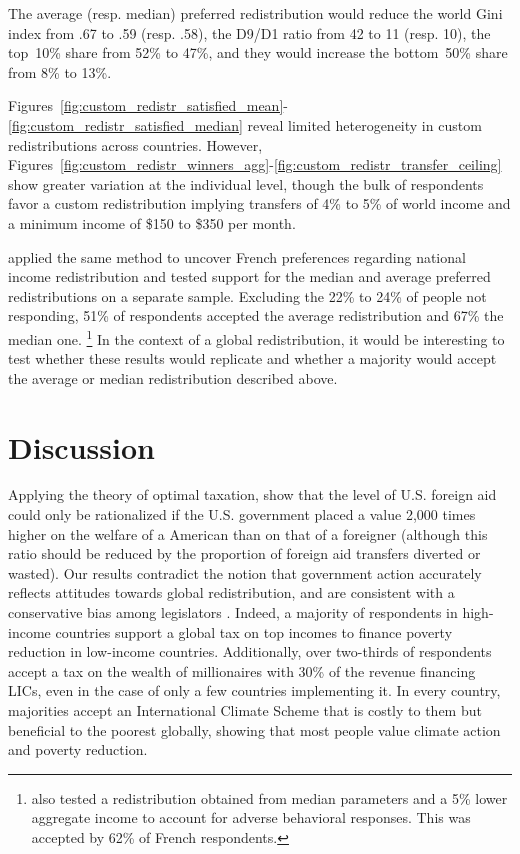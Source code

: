 \documentclass[12pt,english]{article}
\begin{document}
\begin{bibunit}
The average (resp. median) preferred redistribution would reduce the world Gini index from .67 to .59 (resp. .58), the D9/D1 ratio from 42 to 11 (resp. 10), the top~10\% share from 52\% to 47\%, and they would increase the bottom~50\% share from 8\% to 13\%.

Figures~\ref{fig:custom_redistr_satisfied_mean}-\ref{fig:custom_redistr_satisfied_median} reveal limited heterogeneity in custom redistributions across countries. However, Figures~\ref{fig:custom_redistr_winners_agg}-\ref{fig:custom_redistr_transfer_ceiling} show greater variation at the individual level, though the bulk of respondents favor a custom redistribution implying transfers of 4\% to 5\% of world income and a minimum income of \$150 to \$350 per month. 

\cite{fabre_french_2022} applied the same method to uncover French preferences regarding national income redistribution and tested support for the median and average %
preferred redistributions on a separate sample. Excluding the 22\% to 24\% of people not responding, 51\% of respondents accepted the average redistribution and 67\% the median one.%
\footnote{\cite{fabre_french_2022} also tested a redistribution obtained from median parameters and a 5\% lower aggregate income to account for adverse behavioral responses. This was accepted by 62\% of French respondents.} 
In the context of a global redistribution, it would be interesting to test whether these results would replicate and whether a majority would accept the average or median redistribution described above. 

\section{Discussion} %

Applying the theory of optimal taxation, \cite{kopczuk_limitations_2005} show that the level of U.S. foreign aid could only be rationalized if the U.S. government placed a value 2,000 times higher on the welfare of a American than on that of a foreigner (although this ratio should be reduced by the proportion of foreign aid transfers diverted or wasted). 
Our results contradict the notion that government action accurately reflects attitudes towards global redistribution, and are consistent with a conservative bias among legislators \citep{gilens_testing_2014,broockman_bias_2018,pilet_politicians_2024}. 
Indeed, a majority of respondents in high-income countries support a global tax on top incomes to finance poverty reduction in low-income countries. Additionally, over two-thirds of respondents accept a tax on the wealth of millionaires with 30\% of the revenue financing LICs, even in the case of only a few countries implementing it. In every country, majorities accept an International Climate Scheme that is costly to them but beneficial to the poorest globally, showing that most people value climate action and poverty reduction. 


\end{bibunit}
\end{document}

